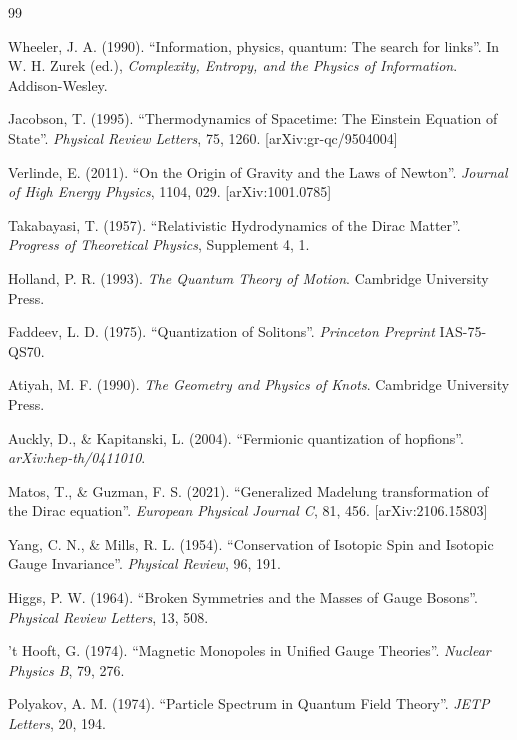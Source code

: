 \documentclass[12pt,a4paper]{book}
\begin{document}
\begin{thebibliography}{99}

 Wheeler, J. A. (1990). ``Information, physics, quantum: The search for links''. In W. H. Zurek (ed.), \textit{Complexity, Entropy, and the Physics of Information}. Addison-Wesley.

 Jacobson, T. (1995). ``Thermodynamics of Spacetime: The Einstein Equation of State''. \textit{Physical Review Letters}, 75, 1260. [arXiv:gr-qc/9504004]

 Verlinde, E. (2011). ``On the Origin of Gravity and the Laws of Newton''. \textit{Journal of High Energy Physics}, 1104, 029. [arXiv:1001.0785]

 Takabayasi, T. (1957). ``Relativistic Hydrodynamics of the Dirac Matter''. \textit{Progress of Theoretical Physics}, Supplement 4, 1.

 Holland, P. R. (1993). \textit{The Quantum Theory of Motion}. Cambridge University Press.

 Faddeev, L. D. (1975). ``Quantization of Solitons''. \textit{Princeton Preprint} IAS-75-QS70.

 Atiyah, M. F. (1990). \textit{The Geometry and Physics of Knots}. Cambridge University Press.

 Auckly, D., \& Kapitanski, L. (2004). ``Fermionic quantization of hopfions''. \textit{arXiv:hep-th/0411010}.

 Matos, T., \& Guzman, F. S. (2021). ``Generalized Madelung transformation of the Dirac equation''. \textit{European Physical Journal C}, 81, 456. [arXiv:2106.15803]

 Yang, C. N., \& Mills, R. L. (1954). ``Conservation of Isotopic Spin and Isotopic Gauge Invariance''. \textit{Physical Review}, 96, 191.

 Higgs, P. W. (1964). ``Broken Symmetries and the Masses of Gauge Bosons''. \textit{Physical Review Letters}, 13, 508.

 't Hooft, G. (1974). ``Magnetic Monopoles in Unified Gauge Theories''. \textit{Nuclear Physics B}, 79, 276.

 Polyakov, A. M. (1974). ``Particle Spectrum in Quantum Field Theory''. \textit{JETP Letters}, 20, 194.


\end{thebibliography}
\end{document}
